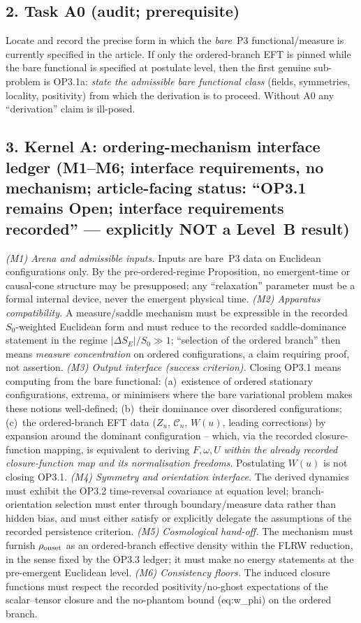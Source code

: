 \subsection*{2. Task A0 (audit; prerequisite)}
Locate and record the precise form in which the \emph{bare}~P3
functional/measure is currently specified in the article.
If only the ordered-branch EFT is pinned while the bare functional
is specified at postulate level, then the first genuine
sub-problem is OP3.1a: \emph{state the admissible bare functional
class} (fields, symmetries, locality, positivity) from which the
derivation is to proceed.
Without A0 any ``derivation'' claim is ill-posed.

\subsection*{3. Kernel A: ordering-mechanism interface ledger
(M1--M6; interface requirements, no mechanism; article-facing
status: ``OP3.1 remains Open; interface requirements recorded'' ---
explicitly NOT a Level~B result)}
\emph{(M1) Arena and admissible inputs.}
Inputs are bare~P3 data on Euclidean configurations only.
By the pre-ordered-regime Proposition, no emergent-time or
causal-cone structure may be presupposed; any ``relaxation''
parameter must be a formal internal device, never the emergent
physical time.
\emph{(M2) Apparatus compatibility.}
A measure/saddle mechanism must be expressible in the recorded
$S_0$-weighted Euclidean form and must reduce to the recorded
saddle-dominance statement in the regime $|\Delta S_E|/S_0\gg1$;
``selection of the ordered branch'' then means \emph{measure
concentration} on ordered configurations, a claim requiring proof,
not assertion.
\emph{(M3) Output interface (success criterion).}
Closing OP3.1 means computing from the bare functional:
(a)~existence of ordered stationary configurations, extrema, or
minimisers where the bare variational problem makes these notions
well-defined;
(b)~their dominance over disordered configurations;
(c)~the ordered-branch EFT data ($Z_u$, $\mathcal C_n$, $W(u)$,
leading corrections) by expansion around the dominant
configuration -- which, via the recorded closure-function mapping,
is equivalent to deriving $F,\omega,U$ \emph{within the already
recorded closure-function map and its normalisation freedoms}.
Postulating $W(u)$ is not closing OP3.1.
\emph{(M4) Symmetry and orientation interface.}
The derived dynamics must exhibit the OP3.2 time-reversal
covariance at equation level; branch-orientation selection must
enter through boundary/measure data rather than hidden bias, and
must either satisfy or explicitly delegate the assumptions of the
recorded persistence criterion.
\emph{(M5) Cosmological hand-off.}
The mechanism must furnish $\rho_{\rm onset}$ as an ordered-branch
effective density within the FLRW reduction, in the sense fixed by
the OP3.3 ledger; it must make no energy statements at the
pre-emergent Euclidean level.
\emph{(M6) Consistency floors.}
The induced closure functions must respect the recorded
positivity/no-ghost expectations of the scalar--tensor closure and
the no-phantom bound (eq:w\_phi) on the ordered branch.

